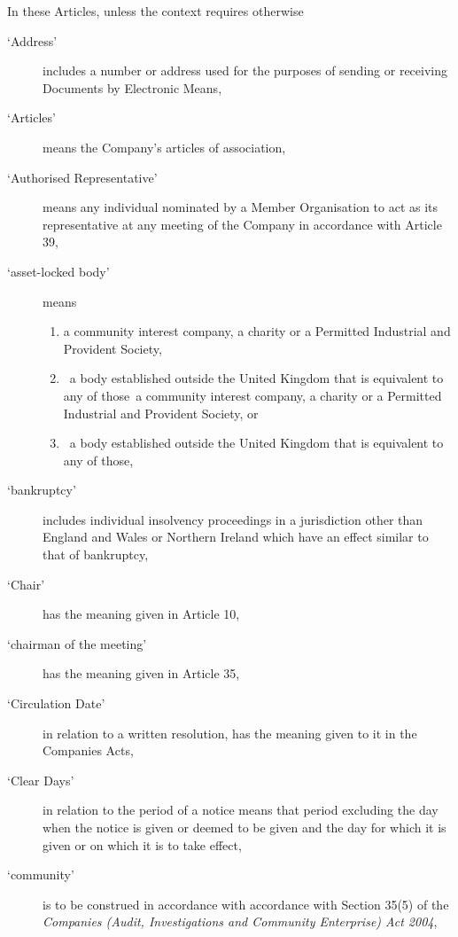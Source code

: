 \documentclass[a4paper,12pt]{article}
\renewcommand{\labelenumi}{\thesection.\arabic{enumi}}
\begin{document}
In these Articles, unless the context requires otherwise %

\begin{description}
  \item[`Address'] includes a number or address used for the purposes of sending or receiving Documents by Electronic Means,
  \item[`Articles'] means the Company’s articles of association,
  \item[`Authorised Representative'] means any individual nominated by a Member Organisation to act as its representative at any meeting of the Company in accordance with Article 39,
  \item[`asset-locked body'] means
  \begin{enumerate}
    \renewcommand{\labelenumi}{(\alph{enumi})}
    \item a community interest company, a charity or a Permitted Industrial and Provident Society,
    \item a body established outside the United Kingdom that is equivalent to any of those a community interest company, a charity or a Permitted Industrial and Provident Society, or
    \item a body established outside the United Kingdom that is equivalent to any of those,
  \end{enumerate}
  \item[`bankruptcy'] includes individual insolvency proceedings in a jurisdiction other than England and Wales or Northern Ireland which have an effect similar to that of bankruptcy,
  \item[`Chair'] has the meaning given in Article 10,
  \item[`chairman of the meeting'] has the meaning given in Article 35,
  \item[`Circulation Date'] in relation to a written resolution, has the meaning given to it in the Companies Acts,
  \item[`Clear Days'] in relation to the period of a notice means that period excluding the day when the notice is given or deemed to be given and the day for which it is given or on which it is to take effect,
  \item[`community'] is to be construed in accordance with accordance with Section 35(5) of the \textit{Companies (Audit, Investigations and Community Enterprise) Act 2004}, %

\end{description}
\end{document}
